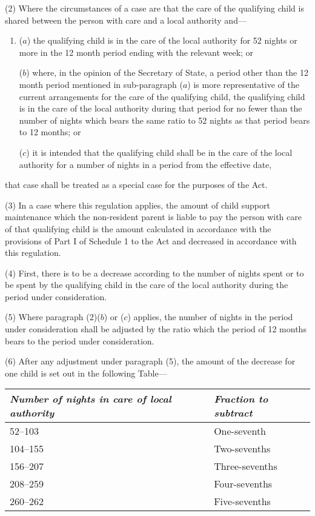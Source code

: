 \documentclass[12pt,a4paper]{article}
\begin{document}
(2) Where the circumstances of a case are that the care of the qualifying child is shared between the person with care and a local authority and—
\begin{enumerate}\item[]
($a$) the qualifying child is in the care of the local authority for 52 nights or more in the 12 month period ending with the relevant week; or

($b$) where, in the opinion of the Secretary of State, a period other than the 12 month period mentioned in sub-paragraph ($a$)  is more representative of the current arrangements for the care of the qualifying child, the qualifying child is in the care of the local authority during that period for no fewer than the number of nights which bears the same ratio to 52 nights as that period bears to 12 months; or

($c$) it is intended that the qualifying child shall be in the care of the local authority for a number of nights in a period from the effective date,
\end{enumerate}
that case shall be treated as a special case for the purposes of the Act.

(3) In a case where this regulation applies, the amount of child support maintenance which the non-resident parent is liable to pay the person with care of that qualifying child is the amount calculated in accordance with the provisions of Part I of Schedule 1 to the Act and decreased in accordance with this regulation.

(4) First, there is to be a decrease according to the number of nights spent or to be spent by the qualifying child in the care of the local authority during the period under consideration.

(5) Where paragraph (2)($b$)  or ($c$)  applies, the number of nights in the period under consideration shall be adjusted by the ratio which the period of 12 months bears to the period under consideration.

(6) After any adjustment under paragraph (5), the amount of the decrease for one child is set out in the following Table—

\begin{center}
\footnotesize
\begin{tabular}{ll}
\hline
\itshape Number of nights in care of local authority	& \itshape Fraction to subtract\\
\hline
52–103	&One-seventh\\
104–155	&Two-sevenths\\
156–207	&Three-sevenths\\
208–259	&Four-sevenths\\
260–262	&Five-sevenths\\
\hline
\end{tabular}
\end{center}
\end{document}
